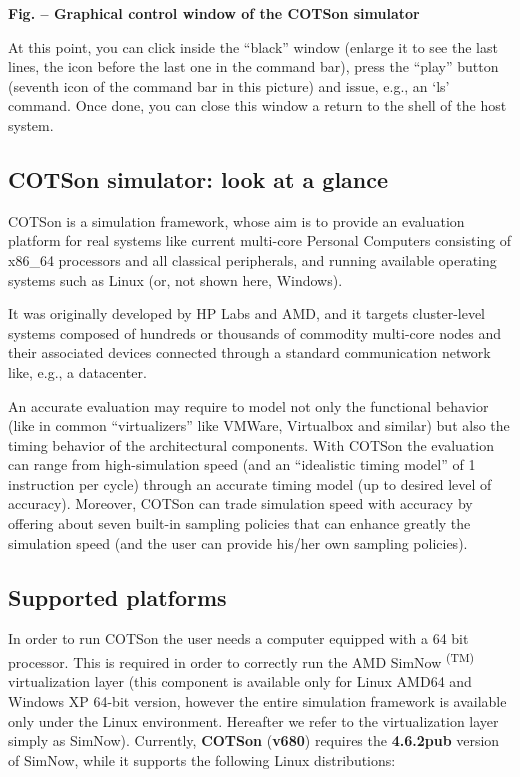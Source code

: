\documentclass[a4paper]{article}
\newcounter{Figure}
\renewcommand\theFigure{\arabic{Figure}}
\begin{document}
{\centering{}\sffamily\bfseries
\label{bkm:Ref388171082}Fig.
\stepcounter{Figure}{\theFigure} -- Graphical control window of the
COTSon simulator
\par}

{
At this point, you can click inside the
{\textquotedblleft}black{\textquotedblright} window (enlarge it to see
the last lines, the icon before the last one in the command bar), press
the {\textquotedblleft}play{\textquotedblright} button (seventh icon of
the command bar in this picture) and issue, e.g., an
{\textquoteleft}ls{\textquoteright} command. Once done, you can close
this window a return to the shell of the host system.}

\subsection[COTSon simulator: look at a glance]{COTSon simulator: look
at a glance}
{
COTSon is a simulation framework, whose aim is to provide an evaluation
platform for real systems like current multi-core Personal Computers
consisting of x86\_64 processors and all classical peripherals, and
running available operating systems such as Linux (or, not shown here,
Windows{\texttrademark}).}

{
It was originally developed by HP Labs and AMD, and it targets
cluster-level systems composed of hundreds or thousands of commodity
multi-core nodes and their associated devices connected through a
standard communication network like, e.g., a datacenter. }

{
An accurate evaluation may require to model not only the functional
behavior (like in common
{\textquotedblleft}virtualizers{\textquotedblright} like
VMWare{\texttrademark}, Virtualbox{\texttrademark} and similar) but
also the timing behavior of the architectural components. With COTSon
the evaluation can range from high-simulation speed (and an
{\textquotedblleft}idealistic timing model{\textquotedblright} of 1
instruction per cycle) through an accurate timing model (up to desired
level of accuracy). Moreover, COTSon can trade simulation speed with
accuracy by offering about seven built-in sampling policies that can
enhance greatly the simulation speed (and the user can provide his/her
own sampling policies).}

\subsection[Supported platforms]{Supported platforms}
{
In order to run COTSon the user needs a computer equipped with a 64 bit
processor. This is required in order to correctly run the AMD SimNow
\textsuperscript{(TM)} virtualization layer (this component is
available only for Linux AMD64 and Windows XP 64-bit version, however
the entire simulation framework is available only under the Linux
environment. Hereafter we refer to the virtualization layer simply as
SimNow). Currently, \textbf{COTSon} (\textbf{v680}) requires the
\textbf{4.6.2pub} version of SimNow, while it supports the following
Linux distributions:}
\end{document}

